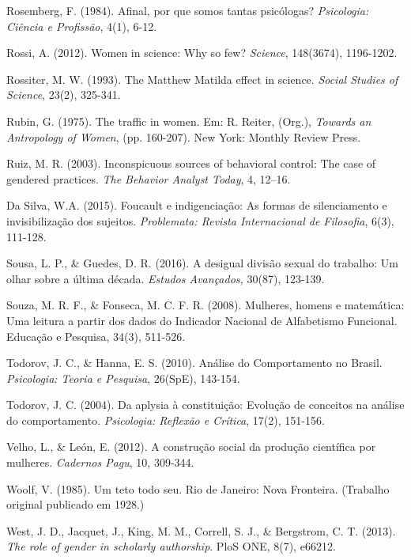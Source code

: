 \hangindent=25pt
\noindent Rosemberg, F. (1984). Afinal, por que somos tantas psicólogas? \textit{Psicologia: Ciência e Profissão}, 4(1), 6-12. 

\hangindent=25pt
\noindent Rossi, A. (2012). Women in science: Why so few? \textit{Science}, 148(3674), 1196-1202.

\hangindent=25pt
\noindent Rossiter, M. W. (1993). The Matthew Matilda effect in science. \textit{Social Studies of Science}, 23(2), 325-341. 

\hangindent=25pt
\noindent Rubin, G. (1975). The traffic in women. Em: R. Reiter, (Org.), \textit{Towards an Antropology of Women}, (pp. 160-207). New York: Monthly Review Press. 

\hangindent=25pt
\noindent Ruiz, M. R. (2003). Inconspicuous sources of behavioral control: The case of gendered practices. \textit{The Behavior Analyst Today}, 4, 12–16. 

\hangindent=25pt
\noindent Da Silva, W.A. (2015). Foucault e indigenciação: As formas de silenciamento e invisibilização dos sujeitos. \textit{Problemata: Revista Internacional de Filosofia}, 6(3), 111-128. 

\hangindent=25pt
\noindent Sousa, L. P., \& Guedes, D. R. (2016). A desigual divisão sexual do trabalho: Um olhar sobre a última década. \textit{Estudos Avançados,} 30(87), 123-139. 

\hangindent=25pt
\noindent Souza, M. R. F., \& Fonseca, M. C. F. R. (2008). Mulheres, homens e matemática: Uma leitura a partir dos dados do Indicador Nacional de Alfabetismo Funcional. Educação e Pesquisa, 34(3), 511-526. 

\hangindent=25pt
\noindent Todorov, J. C., \& Hanna, E. S. (2010). Análise do Comportamento no Brasil. \textit{Psicologia: Teoria e Pesquisa}, 26(SpE), 143-154.

\hangindent=25pt
\noindent Todorov, J. C. (2004). Da aplysia à constituição: Evolução de conceitos na análise do comportamento. \textit{Psicologia: Reflexão e Crítica}, 17(2), 151-156.

\hangindent=25pt
\noindent Velho, L., \& León, E. (2012). A construção social da produção científica por mulheres. \textit{Cadernos Pagu}, 10, 309-344. 

\hangindent=25pt
\noindent Woolf, V. (1985). Um teto todo seu. Rio de Janeiro: Nova Fronteira. (Trabalho original publicado em 1928.)

\hangindent=25pt
\noindent West, J. D., Jacquet, J., King, M. M., Correll, S. J., \& Bergstrom, C. T. (2013). \textit{The role of gender in scholarly authorship}. PloS ONE, 8(7), e66212.